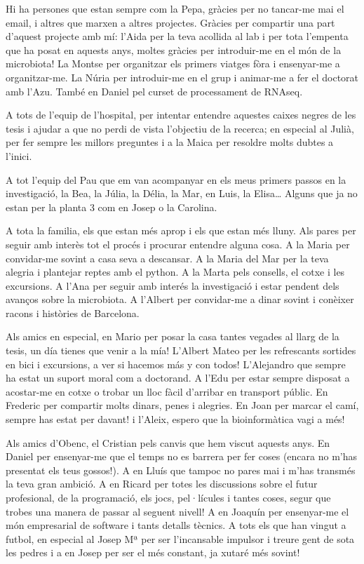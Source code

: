 \documentclass[
  12pt,
  a4paper,
  twoside,
  openright]{book}
\begin{document}
Hi ha persones que estan sempre com la Pepa, gràcies per no tancar-me mai el email, i altres que marxen a altres projectes.
Gràcies per compartir una part d'aquest projecte amb mí:
l'Aida per la teva acollida al lab i per tota l'empenta que ha posat en aquests anys, moltes gràcies per introduir-me en el món de la microbiota!
La Montse per organitzar els primers viatges fòra i ensenyar-me a organitzar-me.
La Núria per introduir-me en el grup i animar-me a fer el doctorat amb l'Azu.
També en Daniel pel curset de processament de RNAseq.

A tots de l'equip de l'hospital, per intentar entendre aquestes caixes negres de les tesis i ajudar a que no perdi de vista l'objectiu de la recerca; en especial al Julià, per fer sempre les millors preguntes i a la Maica per resoldre molts dubtes a l'inici.

A tot l'equip del Pau que em van acompanyar en els meus primers passos en la investigació, la Bea, la Júlia, la Délia, la Mar, en Luis, la Elisa\ldots{}
Alguns que ja no estan per la planta 3 com en Josep o la Carolina.

A tota la familia, els que estan més aprop i els que estan més lluny.
Als pares per seguir amb interès tot el procés i procurar entendre alguna cosa.
A la Maria per convidar-me sovint a casa seva a descansar.
A la Maria del Mar per la teva alegria i plantejar reptes amb el python.
A la Marta pels consells, el cotxe i les excursions.
A l'Ana per seguir amb interés la investigació i estar pendent dels avanços sobre la microbiota.
A l'Albert per convidar-me a dinar sovint i conèixer racons i històries de Barcelona.

Als amics en especial, en Mario per posar la casa tantes vegades al llarg de la tesis, un día tienes que venir a la mía!
L'Albert Mateo per les refrescants sortides en bici i excursions, a ver si hacemos más y con todos!
L'Alejandro que sempre ha estat un suport moral com a doctorand.
A l'Edu per estar sempre disposat a acostar-me en cotxe o trobar un lloc fàcil d'arribar en transport públic.
En Frederic per compartir molts dinars, penes i alegries.
En Joan per marcar el camí, sempre has estat per davant! i l'Aleix, espero que la bioinformàtica vagi a més!

Als amics d'Obenc, el Cristian pels canvis que hem viscut aquests anys.
En Daniel per ensenyar-me que el temps no es barrera per fer coses (encara no m'has presentat els teus gossos!).
A en Lluís que tampoc no pares mai i m'has transmés la teva gran ambició.
A en Ricard per totes les discussions sobre el futur profesional, de la programació, els jocs, pel·lícules i tantes coses, segur que trobes una manera de passar al seguent nivell!
A en Joaquín per ensenyar-me el món empresarial de software i tants detalls tècnics.
A tots els que han vingut a futbol, en especial al Josep Mª per ser l'incansable impulsor i treure gent de sota les pedres i a en Josep per ser el més constant, ja xutaré més sovint!
\end{document}
